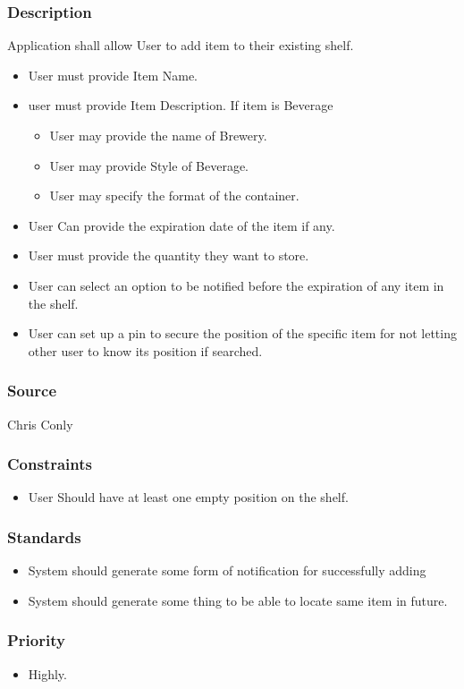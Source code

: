 \subsubsection{Description}
Application shall allow User to add item to their existing shelf.
\begin{itemize}
\item User must provide Item Name.
\item user must provide Item Description.
 If item is Beverage
\begin{itemize}
\item User may provide the name of Brewery.
\item User may provide Style of Beverage.
\item User may specify the format of the container.
\end{itemize}
\item User Can provide the expiration date of the item if any.
\item User must provide the quantity they want to store.
\item User can select an option to be notified before the expiration of any item in the shelf.
\item User can set up a pin to secure the position of the specific item for not letting other user to know its position if searched.
\end{itemize}

\subsubsection{Source}
Chris Conly
\subsubsection{Constraints}
\begin{itemize}
\item User Should have at least one empty position on the shelf.
\end{itemize}
\subsubsection{Standards}
\begin{itemize}
\item System should generate some form of notification for successfully adding  
\item System should generate some thing to be able to locate same item in future.
\end{itemize}
\subsubsection{Priority}
\begin{itemize}
\item Highly.\\ \\
\end{itemize}

